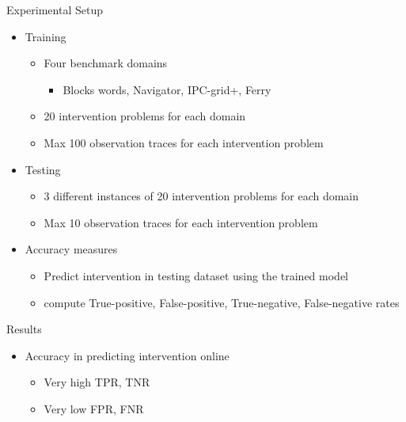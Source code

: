 \begin{frame}{Experimental Setup}
	\begin{itemize}
		\item Training
		\begin{itemize}
			\item Four benchmark domains
			\begin{itemize}
				\item {Blocks words, Navigator, IPC-grid+, Ferry}
			\end{itemize}
			\item 20 intervention problems for each domain
			\item Max 100 observation traces for each intervention problem
		\end{itemize}
		
		\item Testing
		\begin{itemize}
			\item 3 different instances of 20 intervention problems for each domain
			\item Max 10 observation traces for each intervention problem
		\end{itemize}
		
		\item Accuracy measures
			\begin{itemize}
				\item Predict intervention in testing dataset using the trained model
				\item compute True-positive, False-positive, True-negative, False-negative rates 
			\end{itemize}
	\end{itemize}
\end{frame}


\begin{frame}{Results}
	\begin{itemize}
		\item Accuracy in predicting intervention online
		\begin{itemize}
			\item Very high TPR, TNR 
			\item Very low FPR, FNR
		\end{itemize}
		\begin{figure}[p]
			\label{fig:accuracy}
		\end{figure}
	\end{itemize}
\end{frame}
